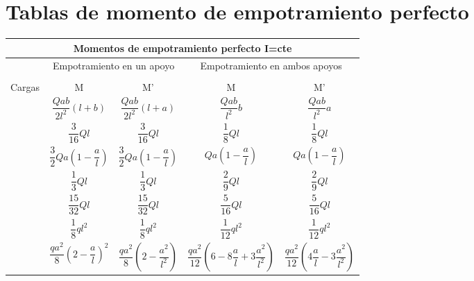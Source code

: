 
\clearpage
\section{Tablas de momento de empotramiento perfecto}

\begin{table}[H]
    \centering
    \resizebox{0.95\textwidth}{!}
    {
    \begin{tabular}{m{4cm}cccc}
         \multicolumn{5}{c}{\Large Momentos de empotramiento perfecto I=cte} \\ \toprule
         & \multicolumn{2}{c}{\large Empotramiento en un apoyo} & \multicolumn{2}{c}{\large Empotramiento en ambos apoyos} \\ \cmidrule{2-5} 
         &   &  & \multicolumn{2}{c}{} \\ \cmidrule{1-5}
        \multicolumn{1}{c}{\large{Cargas}} & \large{M} & \large{M'} & \large{M} & \large{M'} \\ \midrule
         & \large{$\dfrac{Qab}{2l^2}(l+b)$} &  \large{$\dfrac{Qab}{2l^2}(l+a)$} & \large{$\dfrac{Qab}{l^2}b$} & \large{$\dfrac{Qab}{l^2}a$} \\ \midrule
         & \large{$\dfrac{3}{16}Ql$} & \large{$\dfrac{3}{16}Ql$} & \large{$\dfrac{1}{8}Ql$} & \large{$\dfrac{1}{8}Ql$} \\ \midrule
         & \large{$\dfrac{3}{2}Qa\left(1-\dfrac{a}{l}\right)$} & \large{$\dfrac{3}{2}Qa\left(1-\dfrac{a}{l}\right)$} & \large{$Qa\left(1-\dfrac{a}{l}\right)$} & \large{$Qa\left(1-\dfrac{a}{l}\right)$} \\ \midrule
         & \large{$\dfrac{1}{3}Ql$} & \large{$\dfrac{1}{3}Ql$} & \large{$\dfrac{2}{9}Ql$} & \large{$\dfrac{2}{9}Ql$} \\ \midrule
         & \large{$\dfrac{15}{32}Ql$} & \large{$\dfrac{15}{32}Ql$} & \large{$\dfrac{5}{16}Ql$} & \large{$\dfrac{5}{16}Ql$} \\ \midrule
         & \large{$\dfrac{1}{8}ql^2$} & \large{$\dfrac{1}{8}ql^2$} & \large{$\dfrac{1}{12}ql^2$} & \large{$\dfrac{1}{12}ql^2$} \\ \midrule
         & \large{$\dfrac{qa^2}{8}\left(2-\dfrac{a}{l}\right)^2$} & \large{$\dfrac{qa^2}{8}\left(2-\dfrac{a^2}{l^2}\right)$} & \large{$\dfrac{qa^2}{12}\left(6-8\dfrac{a}{l}+3\dfrac{a^2}{l^2}\right)$} & \large{$\dfrac{qa^2}{12}\left(4\dfrac{a}{l}-3\dfrac{a^2}{l^2}\right)$} \\ \midrule

\end{tabular}}
\end{table}
